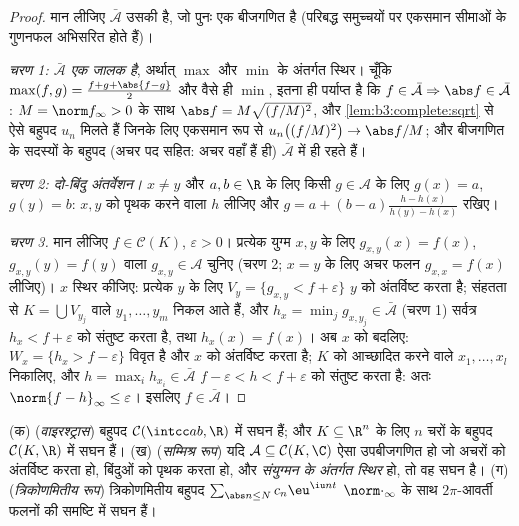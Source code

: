 \begin{proof}
मान लीजिए $\bar{\mathcal A}$ उसकी  है, जो पुनः एक बीजगणित है (परिबद्ध
समुच्चयों पर एकसमान सीमाओं के गुणनफल अभिसरित होते हैं)।

\emph{चरण 1: $\bar{\mathcal A}$ एक जालक है}, अर्थात् $\max$ और $\min$ के अंतर्गत
स्थिर। चूँकि $\max(f,g) = \frac{f + g +
\abs{f-g}}2$ और वैसे ही $\min$, इतना ही पर्याप्त है कि
$f \in
\bar{\mathcal A} \Rightarrow \abs f \in \bar{\mathcal A}$: $M = \norm f_\infty > 0$ के साथ $\abs f = M\sqrt{(f/M)^2}$, और \cref{lem:b3:complete:sqrt} से ऐसे बहुपद $u_n$ मिलते हैं
जिनके लिए एकसमान रूप से $u_n\bigl((f/M)^2\bigr) \to \abs f/M$; और बीजगणित के सदस्यों के बहुपद
(अचर पद सहित: अचर वहाँ हैं ही) $\bar{\mathcal A}$ में ही रहते हैं।

\emph{चरण 2: दो-बिंदु अंतर्वेशन।} $x \neq y$ और $a,
b \in \R$ के लिए किसी
$g \in \mathcal A$ के लिए $g(x) = a$, $g(y) = b$: $x, y$ को पृथक करने वाला $h$ लीजिए
और $g = a + (b -
a)\frac{h - h(x)}{h(y) - h(x)}$ रखिए।

\emph{चरण 3.} मान लीजिए $f \in \mathcal C(K)$, $\varepsilon > 0$। प्रत्येक युग्म $x, y$ के
लिए $g_{x,y}(x) = f(x)$, $g_{x,y}(y) = f(y)$ वाला $g_{x,y} \in \mathcal A$ चुनिए (चरण 2; $x = y$ के लिए अचर फलन
$g_{x,x} = f(x)$ लीजिए)। $x$ स्थिर कीजिए: प्रत्येक $y$ के लिए  $V_y = \{g_{x,y} < f +
\varepsilon\}$ $y$ को अंतर्विष्ट करता है; संहतता से $K = \bigcup V_{y_j}$ वाले
$y_1, \dots,
y_m$ निकल आते हैं, और $h_x = \min_j g_{x, y_j}
\in \bar{\mathcal A}$ (चरण 1) सर्वत्र $h_x < f +
\varepsilon$ को संतुष्ट
करता है, तथा $h_x(x) = f(x)$। अब $x$ को बदलिए: $W_x =
\{h_x > f - \varepsilon\}$ विवृत है और $x$
को अंतर्विष्ट करता है; $K$ को आच्छादित करने वाले $x_1,
\dots, x_l$
निकालिए, और $h = \max_i h_{x_i} \in
\bar{\mathcal A}$ $f - \varepsilon < h < f +
\varepsilon$ को संतुष्ट करता है: अतः $\norm{f - h}_\infty \leq \varepsilon$। इसलिए
$f \in \bar{\mathcal A}$।
\end{proof}

\begin{corollary}\label{cor:b3:complete:weierstrass}
(क) (\emph{वाइरश्ट्रास}) बहुपद $\mathcal
C(\intcc ab, \R)$ में सघन हैं; और  $K \subseteq \R^n$
के लिए $n$ चरों के बहुपद $\mathcal C(K, \R)$ में सघन हैं।
(ख) (\emph{सम्मिश्र रूप}) यदि $\mathcal A \subseteq \mathcal
C(K, \C)$ ऐसा उपबीजगणित हो जो अचरों को
अंतर्विष्ट करता हो, बिंदुओं को पृथक करता हो, और \emph{संयुग्मन के
अंतर्गत स्थिर} हो, तो वह सघन है।
(ग) (\emph{त्रिकोणमितीय रूप}) त्रिकोणमितीय बहुपद $\sum_{\abs n \leq N}c_n\eu^{\iu n t}$ $\norm\cdot_\infty$ के
साथ  $2\pi$-आवर्ती फलनों की समष्टि में सघन
हैं।
\end{corollary}

